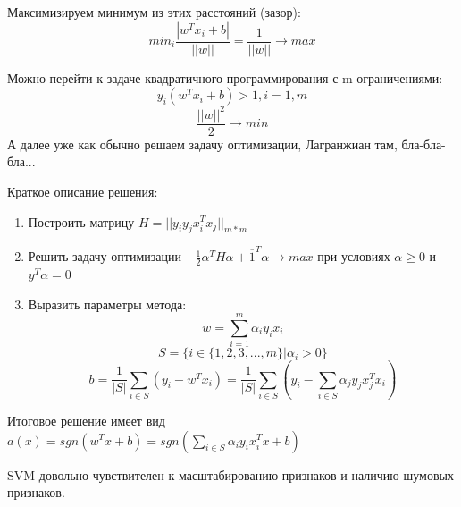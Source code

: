 Максимизируем минимум из этих расстояний (зазор):
\begin{equation}
min_i\frac{|w^Tx_i + b|}{||w||} = \frac{1}{||w||} \rightarrow max
\end{equation}

Можно перейти к задаче квадратичного программирования с m ограничениями:
\begin{equation}
y_i(w^Tx_i + b) > 1, i=\overline{1,m}
\end{equation}
\begin{equation}
\frac{||w||^2}{2} \rightarrow min
\end{equation}
А далее уже как обычно решаем задачу оптимизации, Лагранжиан там, бла-бла-бла...

Краткое описание решения:
\begin{enumerate}
    \item Построить матрицу $H = || y_iy_jx_i^Tx_j ||_{m * m}$
    \item Решить задачу оптимизации $-\frac{1}{2}\alpha^TH\alpha + \overline{1}^T\alpha \rightarrow max$ при условиях $\alpha \geq 0$ и $y^T\alpha = 0$
    \item Выразить параметры метода:
    \begin{equation}
    w = \sum\limits_{i=1}^m \alpha_iy_ix_i
    \end{equation}
    \begin{equation}
    S = \{i \in \{1,2,3,...,m\} | \alpha_i > 0\}
    \end{equation}
    \begin{equation}
    b = \frac{1}{|S|}\sum\limits_{i \in S} (y_i - w^Tx_i) = \frac{1}{|S|}\sum\limits_{i \in S} (y_i - \sum\limits_{i \in S}\alpha_j y_jx_j^Tx_i)
    \end{equation}
\end{enumerate}

Итоговое решение имеет вид $a(x) = sgn(w^Tx + b) = sgn(\sum\limits_{i \in S} \alpha_i y_ix_i^Tx + b)$

SVM довольно чувствителен к масштабированию признаков и наличию шумовых признаков. 